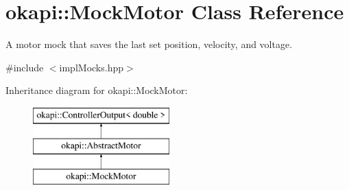 \hypertarget{classokapi_1_1MockMotor}{}\section{okapi\+::Mock\+Motor Class Reference}
\label{classokapi_1_1MockMotor}


A motor mock that saves the last set position, velocity, and voltage.  




{\ttfamily \#include $<$impl\+Mocks.\+hpp$>$}

Inheritance diagram for okapi\+::Mock\+Motor\+:\begin{figure}[H]
\begin{center}
\leavevmode
\includegraphics[height=3.000000cm]{classokapi_1_1MockMotor}
\end{center}
\end{figure}
